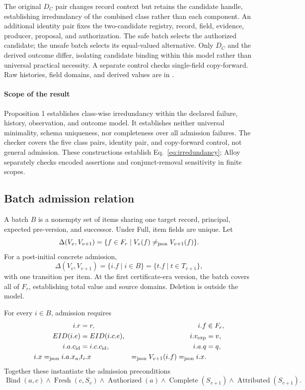 The original $D_C$ pair changes record context but retains the candidate handle, establishing irredundancy of the combined class rather than each component. An additional identity pair fixes the two-candidate registry, record, field, evidence, producer, proposal, and authorization. The safe batch selects the authorized candidate; the unsafe batch selects its equal-valued alternative. Only $D_C$ and the derived outcome differ, isolating candidate binding within this model rather than universal practical necessity. A separate control checks single-field copy-forward. Raw histories, field domains, and derived values are in .

\paragraph{Scope of the result}
Proposition 1 establishes class-wise irredundancy within the declared failure, history, observation, and outcome model. It establishes neither universal minimality, schema uniqueness, nor completeness over all admission failures. The checker covers the five class pairs, identity pair, and copy-forward control, not general admission. These constructions establish Eq.~\eqref{eq:irredundancy}; Alloy separately checks encoded assertions and conjunct-removal sensitivity in finite scopes.

\subsection{Batch admission relation}

A batch $B$ is a nonempty set of items sharing one target record, principal, expected pre-version, and successor. Under Full, item fields are unique. Let
\begin{equation}
\Delta(V_v,V_{v+1})=\{f\in F_r\mid V_v(f)\mathrel{\neq_{\mathrm{json}}} V_{v+1}(f)\}.
\end{equation}
For a post-initial concrete admission,
\begin{equation}
\Delta(V_v,V_{v+1})=\{i.f\mid i\in B\}=\{t.f\mid t\in T_{v+1}\},
\label{eq:changed-fields}
\end{equation}
with one transition per item. At the first certificate-era version, the batch covers all of $F_r$, establishing total value and source domains. Deletion is outside the model.

For every $i\in B$, admission requires
\begin{align}
i.r &= r, & i.f&\in F_r,\nonumber\\
EID(i.e) &= EID(i.c.e), & i.v_{\mathrm{exp}}&=v,\nonumber\\
i.a.c_{\mathrm{id}}&=i.c.c_{\mathrm{id}}, & i.a.q&=q,\nonumber\\
i.x\mathrel{=_{\mathrm{json}}} i.a.x_a, & t_i.x&\mathrel{=_{\mathrm{json}}} V_{v+1}(i.f)\mathrel{=_{\mathrm{json}}} i.x.
\label{eq:item-bindings}
\end{align}
Together these instantiate the admission preconditions
\begin{equation}
\operatorname{Bind}(a,c)\land\operatorname{Fresh}(c,S_v)\land
\operatorname{Authorized}(a)\land\operatorname{Complete}(S_{v+1})\land
\operatorname{Attributed}(S_{v+1}).
\end{equation}

